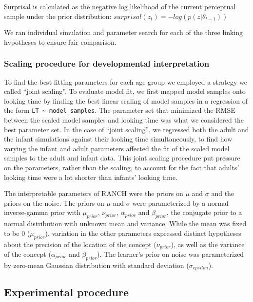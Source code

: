 \documentclass[
]{article}
\begin{document}
Surprisal is calculated as the negative log likelihood of the current perceptual sample under the prior distribution: \(surprisal({z_t}) = -log(p(z|\theta_{t-1}))\)

We ran individual simulation and parameter search for each of the three linking hypotheses to ensure fair comparison.

\hypertarget{scaling-procedure-for-developmental-interpretation}{%
\subsubsection{Scaling procedure for developmental interpretation}\label{scaling-procedure-for-developmental-interpretation}}

To find the best fitting parameters for each age group we employed a strategy we called ``joint scaling''. To evaluate model fit, we first mapped model samples onto looking time by finding the best linear scaling of model samples in a regression of the form \texttt{LT\ \textasciitilde{}\ model\_samples}. The parameter set that minimized the RMSE between the scaled model samples and looking time was what we considered the best parameter set. In the case of ``joint scaling'', we regressed both the adult and the infant simulations against their looking time simultaneously, to find how varying the infant and adult parameters affected the fit of the scaled model samples to the adult and infant data. This joint scaling procedure put pressure on the parameters, rather than the scaling, to account for the fact that adults' looking time were a lot shorter than infants' looking time.

The interpretable parameters of RANCH were the priors on \(\mu\) and \(\sigma\) and the priors on the noise. The priors on \(\mu\) and \(\sigma\) were parameterized by a normal inverse-gamma prior with \(\mu_{prior}\), \(\nu_{prior}\), \(\alpha_{prior}\) and \(\beta_{prior}\), the conjugate prior to a normal distribution with unknown mean and variance. While the mean was fixed to be 0 (\(\mu_{prior}\)), variation in the other parameters expressed distinct hypotheses about the precision of the location of the concept (\(\nu_{prior}\)), as well as the variance of the concept (\(\alpha_{prior}\) and \(\beta_{prior}\)). The learner's prior on noise was parameterized by zero-mean Gaussian distribution with standard deviation (\(\sigma_{epsilon}\)).

\hypertarget{experimental-procedure}{%
\subsection{Experimental procedure}\label{experimental-procedure}}
\end{document}
